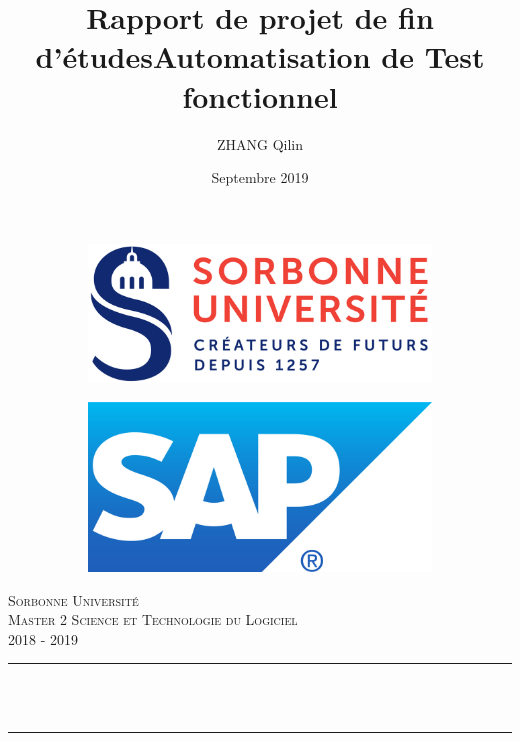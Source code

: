 \documentclass[12pt]{article}
\title{\textbf{Rapport de projet de fin d'études\newline Automatisation de Test fonctionnel}}    %
\author{ZHANG Qilin}		%
\date{Septembre 2019}				%
\makeatletter
\let\thetitle\@title
\makeatother
\begin{document}

\begin{titlepage}
	\centering
    \vspace*{0.5 cm}
    \begin{figure}
        \begin{subfigure}{0.3\textwidth}
        \flushleft
            \includegraphics[width=\textwidth]{Logo_officiel_Sorbonne_University.png}
        \end{subfigure}
        \hspace{.4\textwidth}
        \begin{subfigure}{0.3\textwidth}
            \includegraphics[width=\textwidth]{SAP_R_grad.jpg}
        \end{subfigure}
    \end{figure}
    \textsc{\LARGE Sorbonne Université}\\[2.0 cm]	%
	\textsc{\Large Master 2 Science et Technologie du Logiciel\\2018 - 2019}\\[0.5 cm]		%
	\rule{\linewidth}{0.8 mm} \\[0.6 cm]
	{ \huge \bfseries \thetitle}\\
	\rule{\linewidth}{0.8 mm} \\[2.6 cm]


\end{titlepage}
\end{document}
